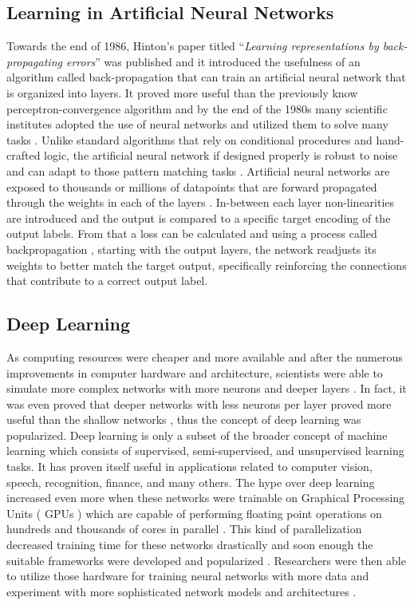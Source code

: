 \subsection{Learning in Artificial Neural Networks}
Towards the end of 1986, Hinton’s paper titled “\textit{Learning representations by back-propagating errors}”\cite{rumelhart1986learning} was published and it introduced the usefulness of an algorithm called back-propagation that can train an artificial neural network that is organized into layers. It proved more useful than the previously know perceptron-convergence algorithm \cite{widrow199030} and by the end of the 1980s many scientific institutes adopted the use of neural networks and utilized them to solve many tasks \cite{pao1989adaptive}. Unlike standard algorithms that rely on conditional procedures and hand-crafted logic, the artificial neural network if designed properly is robust to noise and can adapt to those pattern matching tasks \cite{wang1994robustness}. Artificial neural networks are exposed to thousands or millions of datapoints that are forward propagated through the weights in each of the layers \cite{lecun2015deep}. In-between each layer non-linearities are introduced and the output is compared to a specific target encoding of the output labels. From that a loss can be calculated and using a process called backpropagation \cite{rumelhart1986learning}, starting with the output layers, the network readjusts its weights to better match the target output, specifically reinforcing the connections that contribute to a correct output label.

\subsection{Deep Learning}
As computing resources were cheaper and more available and after the numerous improvements in computer hardware and architecture, scientists were able to simulate more complex networks with more neurons and deeper layers \cite{resnet}. In fact, it was even proved that deeper networks with less neurons per layer proved more useful than the shallow networks \cite{szegedy2015going}, thus the concept of deep learning was popularized. Deep learning is only a subset of the broader concept of machine learning which consists of supervised, semi-supervised, and unsupervised learning tasks. It has proven itself useful in applications related to computer vision, speech, recognition, finance, and many others. The hype over deep learning increased even more when these networks were trainable on Graphical Processing Units ( GPUs ) which are capable of performing floating point operations on hundreds and thousands of cores in parallel \cite{raina2009large}. This kind of parallelization decreased training time for these networks drastically and soon enough the suitable frameworks were developed and popularized \cite{tensorflow, theano}. Researchers were then able to utilize those hardware for training neural networks with more data and experiment with more sophisticated network models and architectures \cite{densenet, raina2009large,resnet}. 

